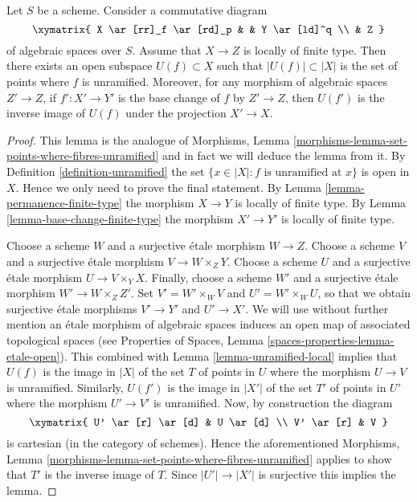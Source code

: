 \begin{lemma}
\label{lemma-where-unramified}
Let $S$ be a scheme. Consider a commutative diagram
$$
\xymatrix{
X \ar[rr]_f \ar[rd]_p & & Y \ar[ld]^q \\
& Z
}
$$
of algebraic spaces over $S$. Assume that $X \to Z$ is locally of
finite type. Then there exists an open subspace $U(f) \subset X$
such that $|U(f)| \subset |X|$ is the set of points where $f$ is unramified.
Moreover, for any morphism of algebraic spaces $Z' \to Z$, if
$f' : X' \to Y'$ is the base change of $f$ by $Z' \to Z$, then
$U(f')$ is the inverse image of $U(f)$ under the projection $X' \to X$.
\end{lemma}

\begin{proof}
This lemma is the analogue of
Morphisms, Lemma \ref{morphisms-lemma-set-points-where-fibres-unramified}
and in fact we will deduce the lemma from it. By
Definition \ref{definition-unramified}
the set $\{x \in |X| : f \text{ is unramified at }x\}$ is
open in $X$. Hence we only need to prove the final statement. By
Lemma \ref{lemma-permanence-finite-type}
the morphism $X \to Y$ is locally of finite type. By
Lemma \ref{lemma-base-change-finite-type}
the morphism $X' \to Y'$ is locally of finite type.

\medskip\noindent
Choose a scheme $W$ and a surjective \'etale morphism $W \to Z$.
Choose a scheme $V$ and a surjective \'etale morphism $V \to W \times_Z Y$.
Choose a scheme $U$ and a surjective \'etale morphism $U \to V \times_Y X$.
Finally, choose a scheme $W'$ and a surjective \'etale morphism
$W' \to W \times_Z Z'$.
Set $V' = W' \times_W V$ and $U' = W' \times_W U$, so that we obtain
surjective \'etale morphisms $V' \to Y'$ and $U' \to X'$.
We will use without further mention an \'etale morphism of algebraic spaces
induces an open map of associated topological spaces (see
Properties of Spaces, Lemma
\ref{spaces-properties-lemma-etale-open}).
This combined with
Lemma \ref{lemma-unramified-local}
implies that $U(f)$ is the image in $|X|$ of the set $T$ of points in $U$
where the morphism $U \to V$ is unramified. Similarly, $U(f')$ is the image
in $|X'|$ of the set $T'$ of points in $U'$ where the morphism $U' \to V'$
is unramified. Now, by construction the diagram
$$
\xymatrix{
U' \ar[r] \ar[d] & U \ar[d] \\
V' \ar[r] & V
}
$$
is cartesian (in the category of schemes). Hence the aforementioned
Morphisms, Lemma \ref{morphisms-lemma-set-points-where-fibres-unramified}
applies to show that $T'$ is the inverse image of $T$. Since
$|U'| \to |X'|$ is surjective this implies the lemma.
\end{proof}

